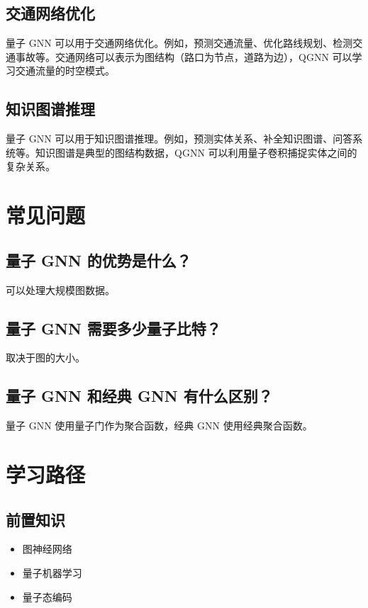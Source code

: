 \documentclass[12pt,a4paper]{article}
\begin{document}
\subsection{交通网络优化}

量子 GNN 可以用于交通网络优化。例如，预测交通流量、优化路线规划、检测交通事故等。交通网络可以表示为图结构（路口为节点，道路为边），QGNN 可以学习交通流量的时空模式。

\subsection{知识图谱推理}

量子 GNN 可以用于知识图谱推理。例如，预测实体关系、补全知识图谱、问答系统等。知识图谱是典型的图结构数据，QGNN 可以利用量子卷积捕捉实体之间的复杂关系。

\section{常见问题}

\subsection{量子 GNN 的优势是什么？}

可以处理大规模图数据。

\subsection{量子 GNN 需要多少量子比特？}

取决于图的大小。

\subsection{量子 GNN 和经典 GNN 有什么区别？}

量子 GNN 使用量子门作为聚合函数，经典 GNN 使用经典聚合函数。

\section{学习路径}

\subsection{前置知识}
\begin{itemize}
  \item 图神经网络
  \item 量子机器学习
  \item 量子态编码
\end{itemize}
\end{document}
